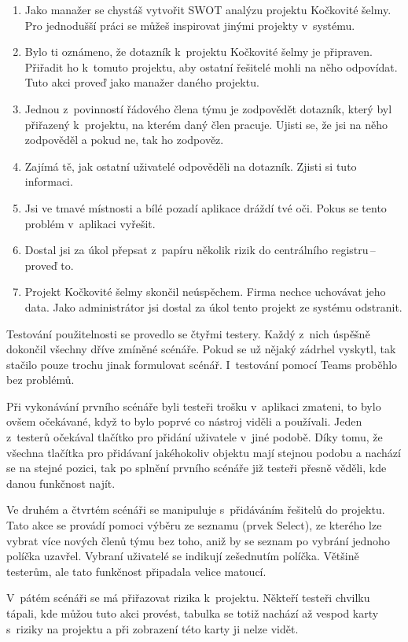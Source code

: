 \begin{enumerate}
    \item Jako manažer se chystáš vytvořit SWOT analýzu projektu Kočkovité šelmy. Pro jednodušší práci se můžeš inspirovat jinými projekty v~systému.
    \item Bylo ti oznámeno, že dotazník k~projektu Kočkovité šelmy je připraven. Přiřadit ho k~tomuto projektu, aby ostatní řešitelé mohli na něho odpovídat. Tuto akci proveď jako manažer daného projektu.
    \item Jednou z~povinností řádového člena týmu je zodpovědět dotazník, který byl přiřazený k~projektu, na kterém daný člen pracuje. Ujisti se, že jsi na něho zodpověděl a pokud ne, tak ho zodpověz.
    \item Zajímá tě, jak ostatní uživatelé odpověděli na dotazník. Zjisti si tuto informaci.
    \item Jsi ve tmavé místnosti a bílé pozadí aplikace dráždí tvé oči. Pokus se tento problém v~aplikaci vyřešit.
    \item Dostal jsi za úkol přepsat z~papíru několik rizik do centrálního registru\,--\,proveď to.
    \item Projekt Kočkovité šelmy skončil neúspěchem. Firma nechce uchovávat jeho data. Jako administrátor jsi dostal za úkol tento projekt ze systému odstranit.
\end{enumerate}

Testování použitelnosti se provedlo se čtyřmi testery. Každý z~nich úspěšně dokončil všechny dříve zmíněné scénáře. Pokud se už nějaký zádrhel vyskytl, tak stačilo pouze trochu jinak formulovat scénář. I~testování pomocí Teams proběhlo bez problémů.

Při vykonávání prvního scénáře byli testeři trošku v~aplikaci zmateni, to bylo ovšem očekávané, když to bylo poprvé co nástroj viděli a používali. Jeden z~testerů očekával tlačítko pro přidání uživatele v~jiné podobě. Díky tomu, že všechna tlačítka pro přidávaní jakéhokoliv objektu mají stejnou podobu a nachází se na stejné pozici, tak po splnění prvního scénáře již testeři přesně věděli, kde danou funkčnost najít.

Ve druhém a čtvrtém scénáři se manipuluje s~přidáváním řešitelů do projektu. Tato akce se provádí pomoci výběru ze seznamu (prvek Select), ze kterého lze vybrat více nových členů týmu bez toho, aniž by se seznam po vybrání jednoho políčka uzavřel. Vybraní uživatelé se indikují zešednutím políčka. Většině testerům, ale tato funkčnost připadala velice matoucí.

V~pátém scénáři se má přiřazovat rizika k~projektu. Někteří testeři chvilku tápali, kde můžou tuto akci provést, tabulka se totiž nachází až vespod karty s~riziky na projektu a při zobrazení této karty ji nelze vidět.

